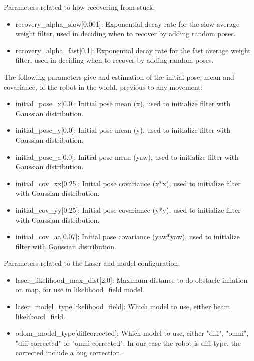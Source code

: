 \documentclass[10pt,journal,compsoc]{IEEEtran}
\begin{document}
Parameters related to how recovering from stuck:

\begin{itemize}
\item recovery\_alpha\_slow[0.001]: Exponential decay rate for the slow average weight filter, used in deciding when to recover by adding random poses.   
\item recovery\_alpha\_fast[0.1]: Exponential decay rate for the fast average weight filter, 
used in deciding when to recover by adding random poses.
\end{itemize}

The following parameters give and estimation of the initial pose, mean and covariance, of the robot in the world, previous to any movement:

\begin{itemize}
\item initial\_pose\_x[0.0]: Initial pose mean (x), used to initialize filter with Gaussian distribution.
\item initial\_pose\_y[0.0]: Initial pose mean (y), used to initialize filter with Gaussian distribution.
\item initial\_pose\_a[0.0]: Initial pose mean (yaw), used to initialize filter with Gaussian distribution.
\item initial\_cov\_xx[0.25]: Initial pose covariance (x*x), used to initialize filter with Gaussian distribution.
\item initial\_cov\_yy[0.25]: Initial pose covariance (y*y), used to initialize filter with Gaussian distribution.
\item initial\_cov\_aa[0.07]: Initial pose covariance (yaw*yaw), used to initialize filter with Gaussian distribution.
\end{itemize}

Parameters related to the Laser and model configuration:

\begin{itemize}
\item laser\_likelihood\_max\_dist[2.0]: Maximum distance to do obstacle inflation on map, for use in likelihood\_field model.
\item laser\_model\_type[likelihood\_field]: Which model to use, either beam, likelihood\_field.
\item odom\_model\_type[diff\-corrected]: Which model to use, either "diff", "omni", "diff-corrected" or "omni-corrected". In our case the robot is diff type, the corrected include a bug correction.
\end{itemize}
\end{document}
